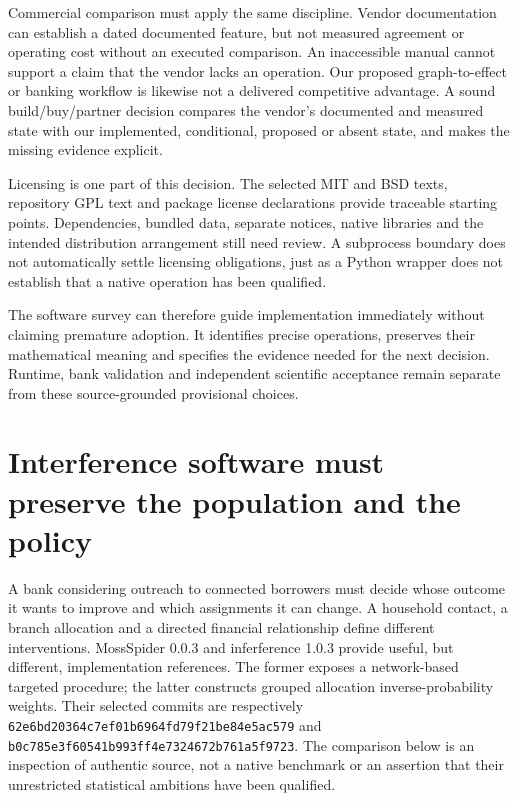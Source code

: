 Commercial comparison must apply the same discipline. Vendor documentation can
establish a dated documented feature, but not measured agreement or operating
cost without an executed comparison. An inaccessible manual cannot support a
claim that the vendor lacks an operation. Our proposed graph-to-effect or
banking workflow is likewise not a delivered competitive advantage. A sound
build/buy/partner decision compares the vendor's documented and measured state
with our implemented, conditional, proposed or absent state, and makes the
missing evidence explicit.

Licensing is one part of this decision. The selected MIT and BSD texts,
repository GPL text and package license declarations provide traceable starting
points. Dependencies, bundled data, separate notices, native libraries and the
intended distribution arrangement still need review. A subprocess boundary
does not automatically settle licensing obligations, just as a Python wrapper
does not establish that a native operation has been qualified.

The software survey can therefore guide implementation immediately without
claiming premature adoption. It identifies precise operations, preserves their
mathematical meaning and specifies the evidence needed for the next decision.
Runtime, bank validation and independent scientific acceptance remain separate
from these source-grounded provisional choices.


\section{Interference software must preserve the population and the policy}
\label{sec:exec24-interference-reuse}

A bank considering outreach to connected borrowers must decide whose outcome it
wants to improve and which assignments it can change. A household contact, a
branch allocation and a directed financial relationship define different
interventions. MossSpider 0.0.3 and inferference 1.0.3 provide useful, but
different, implementation references. The former exposes a network-based
targeted procedure; the latter constructs grouped allocation inverse-probability
weights. Their selected commits are respectively
\texttt{62e6bd20364c7ef01b6964fd79f21be84e5ac579} and
\texttt{b0c785e3f60541b993ff4e7324672b761a5f9723}. The comparison below is
an inspection of authentic source, not a native benchmark or an assertion that
their unrestricted statistical ambitions have been qualified.
\citep{exec24_interference_mossspider,exec24_interference_inferference}

